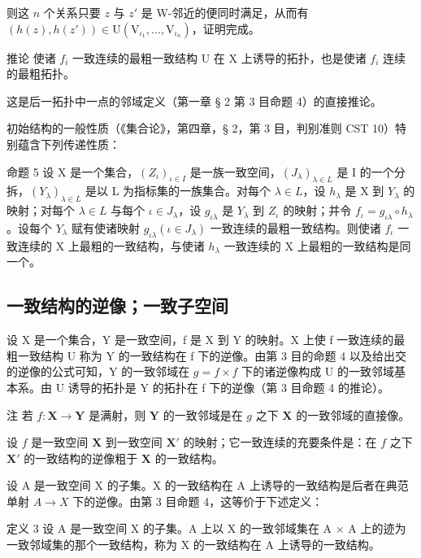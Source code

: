 则这 \(n\) 个关系只要 \(z\) 与 \(z'\) 是 W-邻近的便同时满足，从而有 \((h(z), h(z')) \in \mathrm{U}(\mathrm{V}_{\iota_1}, \ldots, \mathrm{V}_{\iota_n})\)，证明完成。

推论 使诸 \(f_{i}\) 一致连续的最粗一致结构 U 在 X 上诱导的拓扑，也是使诸 \(f_{i}\) 连续的最粗拓扑。

这是后一拓扑中一点的邻域定义（第一章 § 2 第 3 目命题 4）的直接推论。

初始结构的一般性质（《集合论》，第四章，§ 2，第 3 目，判别准则 CST 10）特别蕴含下列传递性质：

命题 5 设 X 是一个集合，\((Z_{\iota})_{\iota \in I}\) 是一族一致空间，\((J_{\lambda})_{\lambda \in L}\) 是 I 的一个分拆，\((Y_{\lambda})_{\lambda \in L}\) 是以 L 为指标集的一族集合。对每个 \(\lambda \in L\)，设 \(h_{\lambda}\) 是 X 到 \(Y_{\lambda}\) 的映射；对每个 \(\lambda \in L\) 与每个 \(\iota \in J_{\lambda}\)，设 \(g_{\iota \lambda}\) 是 \(Y_{\lambda}\) 到 \(Z_{\iota}\) 的映射；并令 \(f_{\iota} = g_{\iota \lambda} \circ h_{\lambda}\)。设每个 \(Y_{\lambda}\) 赋有使诸映射 \(g_{\iota \lambda} (\iota \in J_{\lambda})\) 一致连续的最粗一致结构。则使诸 \(f_{\iota}\) 一致连续的 X 上最粗的一致结构，与使诸 \(h_{\lambda}\) 一致连续的 X 上最粗的一致结构是同一个。

\subsection{一致结构的逆像；一致子空间}

设 X 是一个集合，Y 是一致空间，f 是 X 到 Y 的映射。X 上使 f 一致连续的最粗一致结构 U 称为 Y 的一致结构在 f 下的逆像。由第 3 目的命题 4 以及给出交的逆像的公式可知，Y 的一致邻域在 \(g = f \times f\) 下的诸逆像构成 U 的一致邻域基本系。由 U 诱导的拓扑是 Y 的拓扑在 f 下的逆像（第 3 目命题 4 的推论）。

注 若 \(f: \mathbf{X} \to \mathbf{Y}\) 是满射，则 \(\mathbf{Y}\) 的一致邻域是在 \(g\) 之下 \(\mathbf{X}\) 的一致邻域的直接像。

设 \(f\) 是一致空间 \(\mathbf{X}\) 到一致空间 \(\mathbf{X}'\) 的映射；它一致连续的充要条件是：在 \(f\) 之下 \(\mathbf{X}'\) 的一致结构的逆像粗于 \(\mathbf{X}\) 的一致结构。

设 A 是一致空间 X 的子集。X 的一致结构在 A 上诱导的一致结构是后者在典范单射 \(A \rightarrow X\) 下的逆像。由第 3 目命题 4，这等价于下述定义：

定义 3 设 A 是一致空间 X 的子集。A 上以 X 的一致邻域集在 A × A 上的迹为一致邻域集的那个一致结构，称为 X 的一致结构在 A 上诱导的一致结构。

